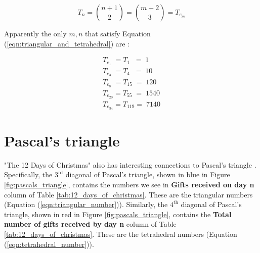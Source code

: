 \documentclass{article}
\theoremstyle{definition}
\begin{document}
\bigskip
\begin{equation}
T_{n} = \binom{n+1}{2} = \binom{m+2}{3} = T_{e_m}
\label{eqn:triangular_and_tetrahedral}
\end{equation}

\vspace{1.5em}
\noindent
Apparently the only $m,n$ that satisfy Equation 
(\ref{eqn:triangular_and_tetrahedral})
are \cite{A027568}:

\medskip
\begin{equation*}
\begin{array}{llllll}
T_{e_1}    \; = T_{1}   \;\; = \; 1    \\
T_{e_3}    \; = T_{4}   \;\; = \; 10   \\
T_{e_8}    \; = T_{15}    \; = \; 120  \\
T_{e_{20}}    = T_{55}    \; = \; 1540 \\
T_{e_{34}}    = T_{119}      = \; 7140 
\end{array}
\end{equation*}

\vspace{0.25em}
\section{Pascal's triangle}
\label{sec:pascals_triangle}
"The 12 Days of Christmas" also has interesting connections to
Pascal's triangle \cite{wiki:pascals_triangle}. Specifically, the
$3^{\text{rd}}$ diagonal of Pascal's triangle, shown in blue in
Figure \ref{fig:pascals_triangle}, contains the numbers we see in
{\bf Gifts received on day n} column of Table
\ref{tab:12_days_of_christmas}. These are the triangular numbers
(Equation (\ref{eqn:triangular_number})).  Similarly, the
$4^{\text{th}}$ diagonal of Pascal's triangle, shown in red in
Figure \ref{fig:pascals_triangle}, contains the {\bf Total number
of gifts received by day n} column of Table
\ref{tab:12_days_of_christmas}. These are the tetrahedral numbers
(Equation (\ref{eqn:tetrahedral_number})).
\end{document}
